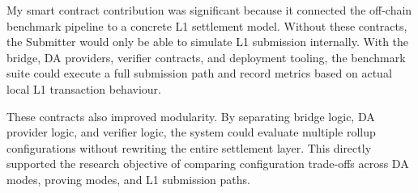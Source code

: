 My smart contract contribution was significant because it connected the off-chain benchmark pipeline to a concrete L1 settlement model. Without these contracts, the Submitter would only be able to simulate L1 submission internally. With the bridge, DA providers, verifier contracts, and deployment tooling, the benchmark suite could execute a full submission path and record metrics based on actual local L1 transaction behaviour.

These contracts also improved modularity. By separating bridge logic, DA provider logic, and verifier logic, the system could evaluate multiple rollup configurations without rewriting the entire settlement layer. This directly supported the research objective of comparing configuration trade-offs across DA modes, proving modes, and L1 submission paths.

